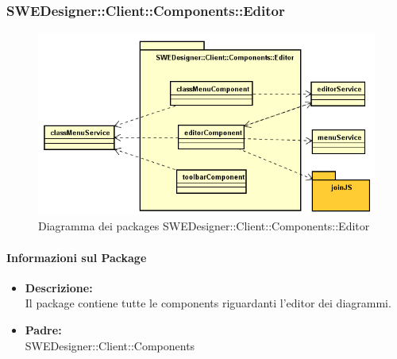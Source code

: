 		\subsubsection{SWEDesigner::Client::Components::Editor}
		 \begin{figure}[h!]
		\centering
		\includegraphics[scale=0.8]{Disegnetti/SWEDesigner__Client__Components__editor.png}
		\caption{Diagramma dei packages SWEDesigner::Client::Components::Editor}
 		\end{figure}
		\paragraph{Informazioni sul Package}
		\begin{itemize}
			\item \textbf{Descrizione: }\\
			Il package contiene tutte le components riguardanti l'editor dei diagrammi.
			\item \textbf{Padre: }\\ SWEDesigner::Client::Components
		\end{itemize}


